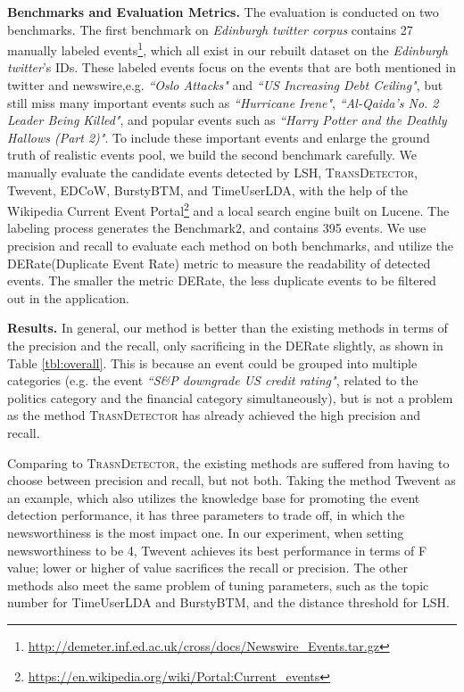 \documentclass[runningheads,a4paper]{llncs}
\theoremstyle{exampstyle}
\begin{document}
\textbf{Benchmarks and Evaluation Metrics.} 
The evaluation is conducted on two benchmarks.
The first benchmark on \textit{Edinburgh twitter corpus} contains 27 manually labeled events\cite{petrovic2013can}\footnote{\url{http://demeter.inf.ed.ac.uk/cross/docs/Newswire_Events.tar.gz}}, which all exist in our rebuilt dataset on the \textit{Edinburgh twitter}'s IDs.
These labeled events focus on the events that are both mentioned in twitter and newswire,e.g. \textit{``Oslo Attacks"} and \textit{``US Increasing Debt Ceiling"}, but still miss many important events such as \textit{``Hurricane Irene"}, \textit{``Al-Qaida's No. 2 Leader Being Killed"}, and popular events such as \textit{``Harry Potter and the Deathly Hallows (Part 2)"}.
To include these important events and enlarge the ground truth of realistic events pool, we build the second benchmark carefully.
We manually evaluate the candidate events detected by LSH,  \textsc{TransDetector}, Twevent, EDCoW, BurstyBTM, and TimeUserLDA, with the help of the Wikipedia Current Event Portal\footnote{\url{https://en.wikipedia.org/wiki/Portal:Current_events}} and a local search engine built on Lucene.
The labeling process generates the Benchmark2, and contains 395 events.
We use precision and recall to evaluate each method on both benchmarks, and utilize the DERate(Duplicate Event Rate) metric\cite{Twevent2012} to measure the readability of detected events.
The smaller the metric DERate, the less duplicate events to be filtered out in the application.


\textbf{Results.}
In general, our method is better than the existing methods in terms of the precision and the recall, only sacrificing in the DERate slightly, as shown in Table \ref{tbl:overall}. 
This is because an event could be grouped into multiple categories (e.g. the event \textit{``S\&P downgrade US credit rating"}, related to the politics category and the financial category simultaneously), but is not a problem as the method \textsc{TrasnDetector} has already achieved the high precision and recall. 

Comparing to \textsc{TrasnDetector}, the existing methods are suffered from having to choose between precision and recall, but not both. 
Taking the method Twevent as an example, which also utilizes the knowledge base for promoting the event detection performance, it has three parameters to trade off, in which the newsworthiness is the most impact one. 
In our experiment, when setting newsworthiness to be 4, Twevent achieves its best performance in terms of F value; lower or higher of value sacrifices the recall or precision. 
The other methods also meet the same problem of tuning parameters, such as the topic number for TimeUserLDA and BurstyBTM, and the distance threshold for LSH.
\end{document}
